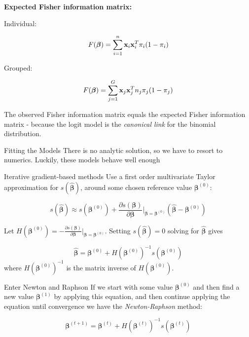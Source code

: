 \documentclass[
  ignorenonframetext,
]{beamer}
\begin{document}
\begin{frame}
\textbf{Expected Fisher information matrix:}

Individual:

\[F(\boldsymbol{\beta})=\sum_{i=1}^n {\bf x}_i {\bf x}_i^T\pi_i (1-\pi_i)\]

Grouped:

\[F(\boldsymbol{\beta})=\sum_{j=1}^G {\bf x}_j {\bf x}_j^T n_j \pi_j (1-\pi_j)\]

The observed Fisher information matrix equals the expected Fisher
information matrix - because the logit model is the \emph{canonical
link} for the binomial distribution.
\end{frame}

\begin{frame}
\begin{block}{Fitting the Models}
\label{fitting-the-models}
There is no analytic solution, so we have to resort to numerics.
Luckily, these models behave well enough
\end{block}
\end{frame}

\begin{frame}
\begin{block}{Iterative gradient-based methods}
\label{iterative-gradient-based-methods}
Use a first order multivariate Taylor approximation for
\(s(\hat{\boldsymbol{\beta}})\), around some chosen reference value
\(\boldsymbol{\beta}^{(0)}\):

\[
s(\hat{\boldsymbol{\beta}})\approx s(\boldsymbol{\beta}^{(0)})+\frac{\partial s(\boldsymbol{\beta})}{\partial \boldsymbol{\beta}}\big\rvert_{\boldsymbol{\beta}=\boldsymbol{\beta}^{(0)}} (\hat{\boldsymbol{\beta}}-\boldsymbol{\beta}^{(0)})
\]

Let
\(H(\boldsymbol{\beta}^{(0)})=-\frac{\partial s(\boldsymbol{\beta})}{\partial \boldsymbol{\beta}}\big\rvert_{\boldsymbol{\beta}=\boldsymbol{\beta}^{(0)}}\).
Setting \(s(\hat{\boldsymbol{\beta}})=0\) solving for
\(\hat{\boldsymbol{\beta}}\) gives

\[
\hat{\boldsymbol{\beta}}=\boldsymbol{\beta}^{(0)} + H(\boldsymbol{\beta}^{(0)})^{-1} s(\boldsymbol{\beta}^{(0)})
\] where \(H(\boldsymbol{\beta}^{(0)})^{-1}\) is the matrix inverse of
\(H(\boldsymbol{\beta}^{(0)})\).
\end{block}
\end{frame}

\begin{frame}
\begin{block}{Enter Newton and Raphson}
\label{enter-newton-and-raphson}
If we start with some value \(\boldsymbol{\beta}^{(0)}\) and then find a
new value \(\boldsymbol{\beta}^{(1)}\) by applying this equation, and
then continue applying the equation until convergence we have the
\emph{Newton-Raphson} method:

\[\boldsymbol{\beta}^{(t+1)}=\boldsymbol{\beta}^{(t)} + H(\boldsymbol{\beta}^{(t)})^{-1} s(\boldsymbol{\beta}^{(t)})\]
\end{block}
\end{frame}
\end{document}
